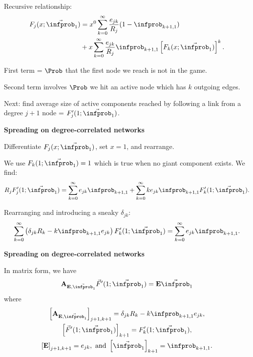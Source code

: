   
   Recursive relationship:
    \begin{align}
      \nonumber
      F_j(x;\vec{\infprob}_1)
      & =
      x^{0}
      \sum_{k=0}^{\infty} 
      \frac{e_{jk}}{R_j}
      ( 1 - \infprob_{k+1,1} )
      \\ 
      \nonumber
      & +
      x
      \sum_{k=0}^{\infty} 
      \frac{e_{jk}}{R_j}
      \infprob_{k+1,1}
      \left[
        F_k(x;\vec{\infprob}_1)
      \right]^k.
    \end{align}
  
    \alert{First term} =
    $\Prob$ that the first node we reach is not in the game.
  
    \alert{Second term} involves
    $\Prob$ we hit an active node which has $k$ outgoing edges.
  
    Next: find average size of active components reached
    by following a link from a degree $j+1$ node = $F_{j}'(1;\vec{\infprob}_1)$.
  



  \textbf{Spreading on degree-correlated networks}

  
  
    Differentiate $F_{j}(x;\vec{\infprob}_1)$,
    set $x=1$, and rearrange.
  
    We use $F_k(1;\vec{\infprob}_1)=1$ which
    is true when no giant component exists.
    {We find:}
    {
      $$
      R_j F_{j}'(1;\vec{\infprob}_1)
      =
      \sum_{k=0}^{\infty}
      e_{jk}
      \infprob_{k+1,1}
      + 
      \sum_{k=0}^{\infty}
      k e_{jk}
      \infprob_{k+1,1}
      F_k'(1;\vec{\infprob}_1).
      $$
    }
    
      Rearranging and introducing a sneaky $\delta_{jk}$:
      $$
      \sum_{k=0}^\infty
      \left(
        \delta_{jk} R_k 
        -
        k \infprob_{k+1,1} e_{jk}
      \right)
      F_k'(1;\vec{\infprob}_1)
      =
      \sum_{k=0}^{\infty}
      e_{jk}
      \infprob_{k+1,1}.
      $$
  
  


  \textbf{Spreading on degree-correlated networks}

  
  
    In matrix form, we have
    $$
    \mathbf{A}_{\mathbf{E},\vec{\infprob}_1 }
    \vec{F}'(1;\vec{\infprob}_1)
    =
    \mathbf{E} \vec{\infprob}_1
    $$
    where 
    \begin{gather}
      \nonumber
      \left[ \mathbf{A}_{\mathbf{E},\vec{\infprob}_1 } \right]_{j+1,k+1}
      = 
      \delta_{jk} R_{k} 
      -
      k \infprob_{k+1,1} e_{jk},
      \\
      \nonumber
      \left[ \vec{F}'(1;\vec{\infprob}_1)  \right]_{k+1}
      = 
      F_{k}'(1;\vec{\infprob}_1),
      \\
      \nonumber
      \left[ \mathbf{E} \right]_{j+1,k+1}
      = 
      e_{jk},
      \
      \mbox{and} \  \left[ \vec{\infprob}_1 \right]_{k+1}
      =
      \infprob_{k+1,1}.
    \end{gather}
  

